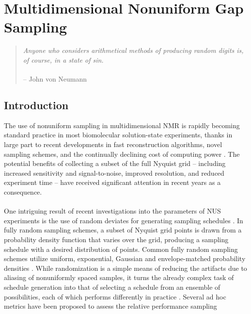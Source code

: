 
\chapter{Multidimensional Nonuniform Gap Sampling}

\begin{quote}
{\it
  Anyone who considers arithmetical methods of producing random digits is,
  of course, in a state of sin.}
\\\\
 -- John von Neumann
\end{quote}

\section{Introduction}

\begin{doublespace}
The use of nonuniform sampling in multidimensional NMR is rapidly becoming
standard practice in most biomolecular solution-state experiments, thanks in
large part to recent developments in fast reconstruction algorithms, novel
sampling schemes, and the continually declining cost of computing power
\cite{mobli:pnmrs2014}. The potential benefits of collecting a subset of the
full Nyquist grid -- including increased sensitivity and signal-to-noise,
improved resolution, and reduced experiment time -- have received significant
attention \cite{
  rovnyak:jmr2004, rovnyak:jbnmr2004, kazimierczuk:angew2011,
  hyberts:jbnmr2013, palmer:jbnmr2014} in recent years as a consequence.
\\\\
One intriguing result of recent investigations into the parameters of NUS
experiments is the use of random deviates for generating sampling schedules
\cite{hoch:jmr2008}. In fully random sampling schemes, a subset of Nyquist
grid points is drawn from a probability density function that varies over the
grid, producing a sampling schedule with a desired distribution of points.
Common fully random sampling schemes utilize uniform, exponential, Gaussian
and envelope-matched probability densities
\cite{palmer:jbnmr2014,schuyler:jbnmr2011}. While randomization is a simple
means of reducing the artifacts due to aliasing of nonuniformly spaced samples,
it turns the already complex task of schedule generation into that of selecting
a schedule from an ensemble of possibilities, each of which performs
differently in practice \cite{hyberts:jacs2010,mobli:jmr2015}. Several ad hoc
metrics have been proposed to assess the relative performance sampling

\end{doublespace}

